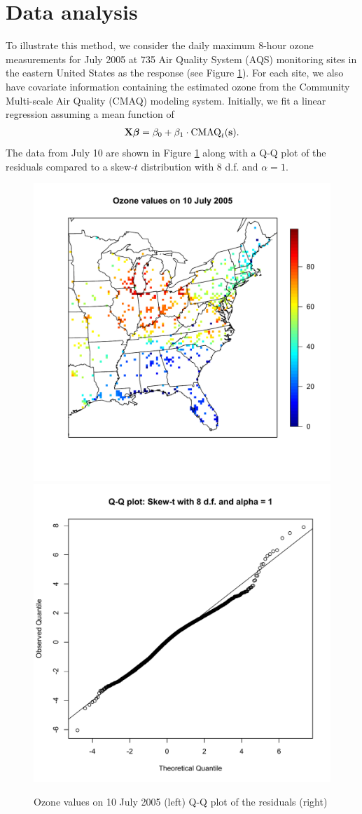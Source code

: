 \documentclass[11pt]{article}
\begin{document}
\section{Data analysis}\label{s:analysis}
To illustrate this method, we consider the daily maximum 8-hour ozone measurements for July 2005 at 735 Air Quality System (AQS) monitoring sites in the eastern United States as the response (see Figure \ref{fig:ozone}).
For each site, we also have covariate information containing the estimated ozone from the Community Multi-scale Air Quality (CMAQ) modeling system.
Initially, we fit a linear regression assuming a mean function of
\begin{align}
  \mbox{\bf X} \mbox{\boldmath $\beta$} = \beta_0 + \beta_1 \cdot \text{CMAQ}_t(\mbox{\bf s}). \label{eq:datamean}
\end{align}
The data from July 10 are shown in Figure \ref{fig:ozone} along with a Q-Q plot of the residuals compared to a skew-$t$ distribution with 8 d.f. and $\alpha = 1$.
\begin{center}
\begin{figure}
  \includegraphics[width=0.5\linewidth]{plots/ozone-10jul.pdf}
  \includegraphics[width=0.5\linewidth]{plots/qq-res.pdf}
  \caption{Ozone values on 10 July 2005 (left) Q-Q plot of the residuals (right)}
  \label{fig:ozone}
\end{figure}
\end{center}
\end{document}

